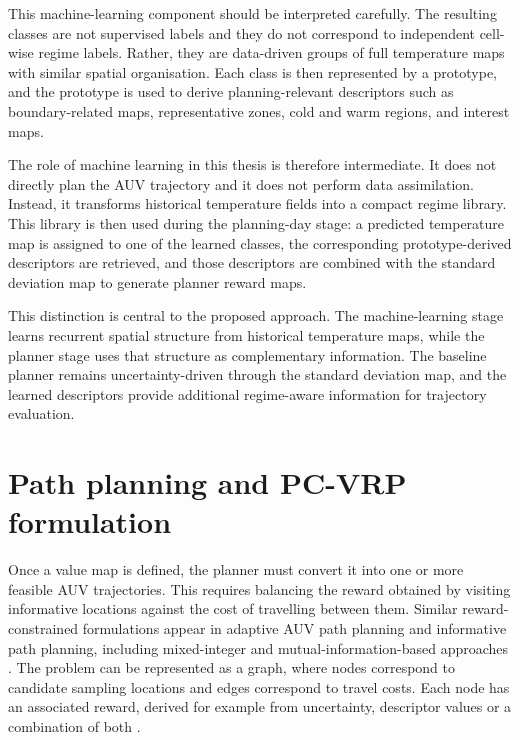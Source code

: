 This machine-learning component should be interpreted carefully. The resulting classes are not supervised labels and they do not correspond to independent cell-wise regime labels. Rather, they are data-driven groups of full temperature maps with similar spatial organisation. Each class is then represented by a prototype, and the prototype is used to derive planning-relevant descriptors such as boundary-related maps, representative zones, cold and warm regions, and interest maps.

The role of machine learning in this thesis is therefore intermediate. It does not directly plan the AUV trajectory and it does not perform data assimilation. Instead, it transforms historical temperature fields into a compact regime library. This library is then used during the planning-day stage: a predicted temperature map is assigned to one of the learned classes, the corresponding prototype-derived descriptors are retrieved, and those descriptors are combined with the standard deviation map to generate planner reward maps.

This distinction is central to the proposed approach. The machine-learning stage learns recurrent spatial structure from historical temperature maps, while the planner stage uses that structure as complementary information. The baseline planner remains uncertainty-driven through the standard deviation map, and the learned descriptors provide additional regime-aware information for trajectory evaluation.




\section{Path planning and PC-VRP formulation} \label{sec:pcvrp}

Once a value map is defined, the planner must convert it into one or more feasible AUV trajectories. This requires balancing the reward obtained by visiting informative locations against the cost of travelling between them. Similar reward-constrained formulations appear in adaptive AUV path planning and informative path planning, including mixed-integer and mutual-information-based approaches \cite{yilmaz2008auvMILP,binney2010informative}. The problem can be represented as a graph, where nodes correspond to candidate sampling locations and edges correspond to travel costs. Each node has an associated reward, derived for example from uncertainty, descriptor values or a combination of both \cite{bernacchi2025closingloop}.

